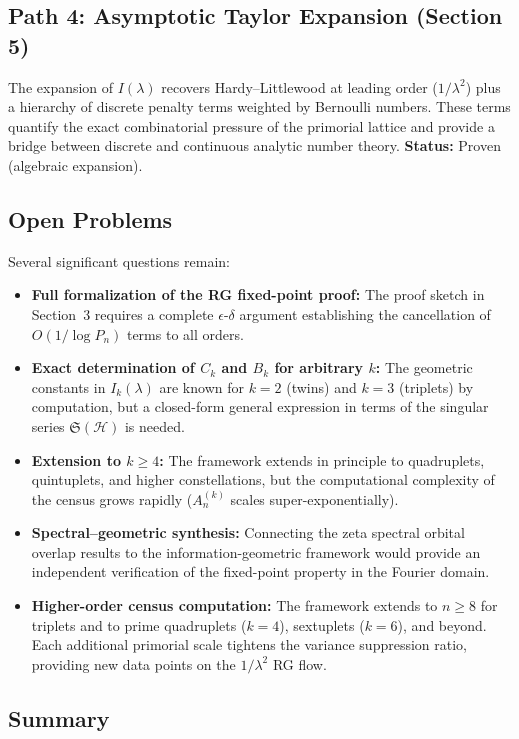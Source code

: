 \documentclass[11pt]{article}
\theoremstyle{remark}
\begin{document}
\subsection*{Path 4: Asymptotic Taylor Expansion (Section 5)}
The expansion of $I(\lambda)$ recovers Hardy--Littlewood at leading
order ($1/\lambda^2$) plus a hierarchy of discrete penalty terms weighted
by Bernoulli numbers. These terms quantify the exact combinatorial
pressure of the primorial lattice and provide a bridge between discrete
and continuous analytic number theory.
\textbf{Status:} Proven (algebraic expansion).

\subsection*{Open Problems}
Several significant questions remain:
\begin{itemize}
    \item \textbf{Full formalization of the RG fixed-point proof:}
    The proof sketch in Section~3 requires a complete $\epsilon$-$\delta$
    argument establishing the cancellation of $O(1/\log P_n)$ terms to
    all orders.
    \item \textbf{Exact determination of $C_k$ and $B_k$ for arbitrary $k$:}
    The geometric constants in $I_k(\lambda)$ are known for $k=2$
    (twins) and $k=3$ (triplets) by computation, but a closed-form
    general expression in terms of the singular series
    $\mathfrak{S}(\mathcal{H})$ is needed.
    \item \textbf{Extension to $k \geq 4$:} The framework extends in
    principle to quadruplets, quintuplets, and higher constellations,
    but the computational complexity of the census grows rapidly
    ($A_n^{(k)}$ scales super-exponentially).
    \item \textbf{Spectral–geometric synthesis:} Connecting the zeta
    spectral orbital overlap results to the information-geometric
    framework would provide an independent verification of the fixed-point
    property in the Fourier domain.
    \item \textbf{Higher-order census computation:} The framework extends
    to $n \geq 8$ for triplets and to prime quadruplets ($k=4$), sextuplets
    ($k=6$), and beyond. Each additional primorial scale tightens the
    variance suppression ratio, providing new data points on the
    $1/\lambda^2$ RG flow.
\end{itemize}

\subsection*{Summary}
\end{document}
